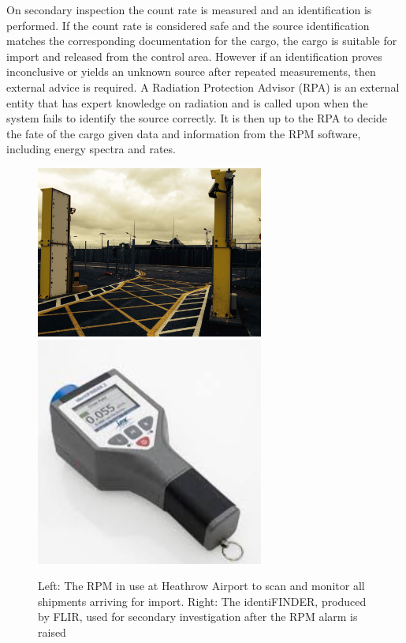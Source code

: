 On secondary inspection the count rate is measured and an identification is performed. If the count rate is considered safe and the source identification matches the corresponding documentation for the cargo, the cargo is suitable for import and released from the control area. However if an identification proves inconclusive or yields an unknown source after repeated measurements, then external advice is required. A Radiation Protection Advisor (RPA) is an external entity that has expert knowledge on radiation and is called upon when the system fails to identify the source correctly. It is then up to the RPA to decide the fate of the cargo given data and information from the RPM software, including energy spectra and rates.

\begin{figure}
\begin{center}
\includegraphics[width=75mm]{./Chapter7/figures/rpm1.png}
\includegraphics[width=75mm]{./Chapter7/figures/identiFINDER.jpg}
\end{center}
\caption{Left: The RPM in use at Heathrow Airport to scan and monitor all shipments arriving for import. Right: The identiFINDER, produced by FLIR, used for secondary investigation after the RPM alarm is raised}
\label{fig:detectorsAtHeathrow}
\end{figure}

